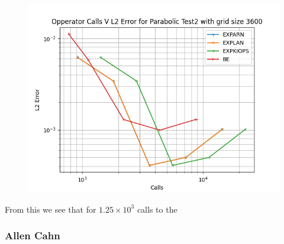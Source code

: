 \documentclass{article}
\begin{document}
\begin{figure}[H]
	  \includegraphics[width=\linewidth]{FEMethodPlots/Operator Calls V Error for Parabolic Test2 with grid size 3600.png}
\end{figure}

From this we see that for $1.25\times 10^{3}$ calls to the 

\subsubsection{Allen Cahn}
\clearpage
\newpage


\end{document}
